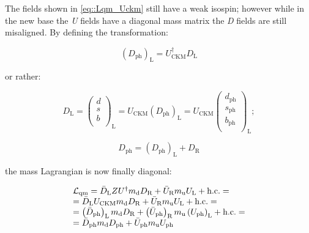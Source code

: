 The fields shown in \autoref{eq::Lqm_Uckm} still have a weak isospin; however while in the new base the \textit{U} fields have a diagonal mass matrix the \textit{D} fields are still misaligned. By defining the transformation:

\begin{equation}
\left(D_{\text{ph}}\right)_{\text{L}} = U^{\dagger}_{\text{CKM}}D_{\text{L}}
\end{equation}

or rather:

\begin{equation}
D_{\text{L}} = 
\begin{pmatrix}
d  \\
s  \\
b \\
\end{pmatrix}
_{\text{L}} =
U_{\text{CKM}}\left(D_{\text{ph}}\right)_{\text{L}} = U_{\text{CKM}}
\begin{pmatrix}
d_{\text{ph}}  \\
s_{\text{ph}}  \\
b_{\text{ph}} \\
\end{pmatrix}
_{\text{L}} ;
\end{equation}

\begin{equation}
D_{\text{ph}} = \left(D_{\text{ph}}\right)_{\text{L}} + D_{\text{R}}
\end{equation}

the mass Lagrangian is now finally diagonal:

\begin{equation}
\begin{array}{l c l}
\mathcal{L}_{\text{qm}} = \bar{D}_{\text{L}}ZU^{\dagger}m_{\text{d}}D_{\text{R}} + \bar{U}_{\text{R}}m_{\text{u}}U_{\text{L}} + \text{h.c.} = \\
= \bar{D}_{\text{L}}U_{\text{CKM}}m_{\text{d}}D_{\text{R}} + \bar{U}_{\text{R}}m_{\text{u}}U_{\text{L}} + \text{h.c.} = \\
=  \left(\bar{D}_{\text{ph}}\right)_{\text{L}}m_{\text{d}}D_{\text{R}} + \left(\bar{U}_{\text{ph}}\right)_{\text{R}}m_{\text{u}}\left(U_{\text{ph}}\right)_{\text{L}} + \text{h.c.} = \\
= \bar{D}_{\text{ph}}m_{\text{d}}D_{\text{ph}} + \bar{U}_{\text{ph}}m_{\text{u}}U_{\text{ph}}
\label{eq::Lqm_Uckm_diagonal}
\end{array}
\end{equation}

